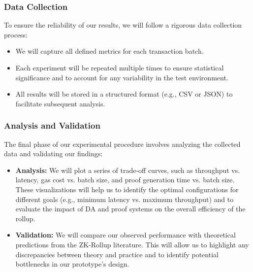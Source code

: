 \subsubsection{Data Collection}
To ensure the reliability of our results, we will follow a rigorous data collection process:
\begin{itemize}
\item We will capture all defined metrics for each transaction batch.
\item Each experiment will be repeated multiple times to ensure statistical significance and to account for any variability in the test environment.
\item All results will be stored in a structured format (e.g., CSV or JSON) to facilitate subsequent analysis.
\end{itemize}

\subsubsection{Analysis and Validation}
The final phase of our experimental procedure involves analyzing the collected data and validating our findings:
\begin{itemize}
\item \textbf{Analysis:} We will plot a series of trade-off curves, such as throughput vs. latency, gas cost vs. batch size, and proof generation time vs. batch size. These visualizations will help us to identify the optimal configurations for different goals (e.g., minimum latency vs. maximum throughput) and to evaluate the impact of DA and proof systems on the overall efficiency of the rollup.
\item \textbf{Validation:} We will compare our observed performance with theoretical predictions from the ZK-Rollup literature. This will allow us to highlight any discrepancies between theory and practice and to identify potential bottlenecks in our prototype's design.
\end{itemize}

% 